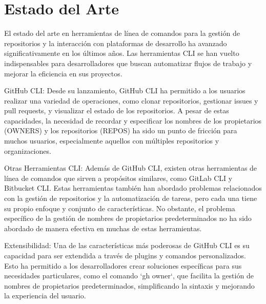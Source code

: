 \section{Estado del Arte}
El estado del arte en herramientas de línea de comandos para la gestión de repositorios y la interacción con plataformas de desarrollo ha avanzado significativamente en los últimos años. Las herramientas CLI se han vuelto indispensables para desarrolladores que buscan automatizar flujos de trabajo y mejorar la eficiencia en sus proyectos.

GitHub CLI: Desde su lanzamiento, GitHub CLI ha permitido a los usuarios realizar una variedad de operaciones, como clonar repositorios, gestionar issues y pull requests, y visualizar el estado de los repositorios. A pesar de estas capacidades, la necesidad de recordar y especificar los nombres de los propietarios (OWNERS) y los repositorios (REPOS) ha sido un punto de fricción para muchos usuarios, especialmente aquellos con múltiples repositorios y organizaciones.

Otras Herramientas CLI: Además de GitHub CLI, existen otras herramientas de línea de comandos que sirven a propósitos similares, como GitLab CLI y Bitbucket CLI. Estas herramientas también han abordado problemas relacionados con la gestión de repositorios y la automatización de tareas, pero cada una tiene su propio enfoque y conjunto de características. No obstante, el problema específico de la gestión de nombres de propietarios predeterminados no ha sido abordado de manera efectiva en muchas de estas herramientas.

Extensibilidad: Una de las características más poderosas de GitHub CLI es su capacidad para ser extendida a través de plugins y comandos personalizados. Esto ha permitido a los desarrolladores crear soluciones específicas para sus necesidades particulares, como el comando `gh owner`, que facilita la gestión de nombres de propietarios predeterminados, simplificando la sintaxis y mejorando la experiencia del usuario.
